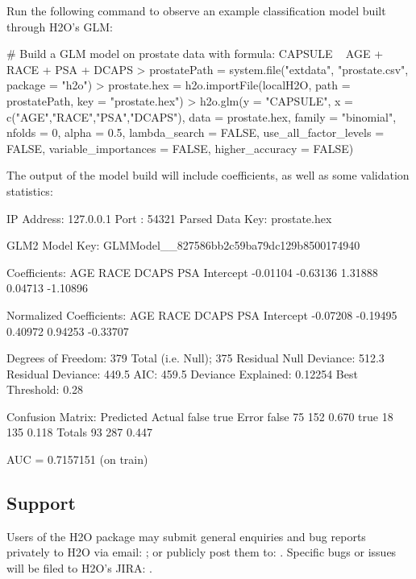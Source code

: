 \documentclass[11pt]{article}
\begin{document}
\noindent
Run the following command to observe an example classification model built through H2O's GLM:

\begin{spverbatim}
# Build a GLM model on prostate data with formula: CAPSULE ~ AGE + RACE + PSA + DCAPS
> prostatePath = system.file("extdata", "prostate.csv", package = "h2o")
> prostate.hex = h2o.importFile(localH2O, path = prostatePath, key = "prostate.hex")
> h2o.glm(y = "CAPSULE", x = c("AGE","RACE","PSA","DCAPS"), data = prostate.hex, family = "binomial", nfolds = 0, alpha = 0.5, lambda_search = FALSE,  
use_all_factor_levels = FALSE, variable_importances = FALSE, higher_accuracy = FALSE)
\end{spverbatim}

\vspace{10 mm}
\noindent
The output of the model build will include coefficients, as well as some validation statistics:

\begin{spverbatim}       
IP Address: 127.0.0.1 
Port      : 54321 
Parsed Data Key: prostate.hex 

GLM2 Model Key: GLMModel__827586bb2c59ba79dc129b8500174940

Coefficients:
      AGE      RACE     DCAPS       PSA Intercept 
 -0.01104  -0.63136   1.31888   0.04713  -1.10896 

Normalized Coefficients:
      AGE      RACE     DCAPS       PSA Intercept 
 -0.07208  -0.19495   0.40972   0.94253  -0.33707 

Degrees of Freedom: 379 Total (i.e. Null);  375 Residual
Null Deviance:     512.3
Residual Deviance: 449.5  AIC: 459.5
Deviance Explained: 0.12254 
 Best Threshold: 0.28

Confusion Matrix:
        Predicted
Actual   false true Error
  false     75  152 0.670
  true      18  135 0.118
  Totals    93  287 0.447

AUC =  0.7157151 (on train)
\end{spverbatim}

\subsection{Support} 

Users of the H2O package may submit general enquiries and bug reports privately to H2O via email: ; or publicly post them to: . Specific bugs or issues will be filed to H2O's JIRA: 
.
\end{document}
